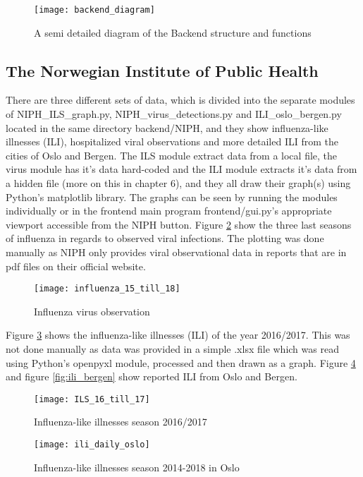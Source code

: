 \begin{figure}[!htb]
\texttt{[image: backend\_diagram]}
\centering
\caption{A semi detailed diagram of the Backend structure and functions}
\label{fig:backend_diagram}
\end{figure}

\newpage


\subsection{The Norwegian Institute of Public Health}
There are three different sets of data, which is divided into the separate modules of NIPH\_ILS\_graph.py, NIPH\_virus\_detections.py and ILI\_oslo\_bergen.py located in the same directory backend/NIPH, and they show influenza-like illnesses (ILI), hospitalized viral observations and more detailed ILI from the cities of Oslo and Bergen. The ILS module extract data from a local file, the virus module has it's data hard-coded and the ILI module extracts it's data from a hidden file (more on this in chapter 6), and they all draw their graph(s) using Python's matplotlib library. The graphs can be seen by running the modules individually or in the frontend main program frontend/gui.py's appropriate viewport accessible from the NIPH button. Figure \ref{fig:infstat} show the three last seasons of influenza in regards to observed viral infections. The plotting was done manually as NIPH only provides viral observational data in reports that are in pdf files on their official website\cite{fhi}.

\begin{figure}[h]
\texttt{[image: influenza\_15\_till\_18]}
\centering
\caption{Influenza virus observation}
\label{fig:infstat}
\end{figure}

Figure \ref{fig:ilsstat} shows the influenza-like illnesses (ILI) of the year 2016/2017. This was not done manually as data was provided in a simple .xlsx file which was read using Python's openpyxl module, processed and then drawn as a graph. Figure \ref{fig:ili_oslo} and figure \ref{fig:ili_bergen} show reported ILI from Oslo and Bergen.

\begin{figure}[ht]
\texttt{[image: ILS\_16\_till\_17]}
\centering
\caption{Influenza-like illnesses season 2016/2017}
\label{fig:ilsstat}
\end{figure}

\begin{figure}[ht]
\texttt{[image: ili\_daily\_oslo]}
\centering
\caption{Influenza-like illnesses season 2014-2018 in Oslo}
\label{fig:ili_oslo}
\end{figure}

